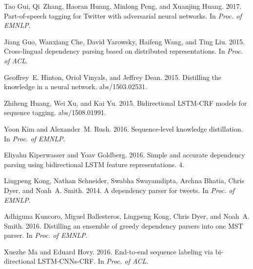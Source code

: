 \documentclass[11pt,a4paper]{article}
\begin{document}
\begin{thebibliography}{}
	Tao Gui, Qi~Zhang, Haoran Huang, Minlong Peng, and Xuanjing Huang. 2017.
	\newblock Part-of-speech tagging for {Twitter} with adversarial neural
	networks.
	\newblock In {\em Proc. of EMNLP\/}.
	
	Jiang Guo, Wanxiang Che, David Yarowsky, Haifeng Wang, and Ting Liu. 2015.
	\newblock Cross-lingual dependency parsing based on distributed
	representations.
	\newblock In {\em Proc. of ACL\/}.
	
	Geoffrey~E. Hinton, Oriol Vinyals, and Jeffrey Dean. 2015.
	\newblock Distilling the knowledge in a neural network.
	 abs/1503.02531.
	
	Zhiheng Huang, Wei Xu, and Kai Yu. 2015.
	\newblock Bidirectional {LSTM-CRF} models for sequence tagging.
	 abs/1508.01991.
	
	Yoon Kim and Alexander~M. Rush. 2016.
	\newblock Sequence-level knowledge distillation.
	\newblock In {\em Proc. of EMNLP\/}.
	
	Eliyahu Kiperwasser and Yoav Goldberg. 2016.
	\newblock Simple and accurate dependency parsing using bidirectional {LSTM}
	feature representations.
	 4.
	
	Lingpeng Kong, Nathan Schneider, Swabha Swayamdipta, Archna Bhatia, Chris Dyer,
	and Noah~A. Smith. 2014.
	\newblock A dependency parser for tweets.
	\newblock In {\em Proc. of EMNLP\/}.
	
	Adhiguna Kuncoro, Miguel Ballesteros, Lingpeng Kong, Chris Dyer, and Noah~A.
	Smith. 2016.
	\newblock Distilling an ensemble of greedy dependency parsers into one {MST}
	parser.
	\newblock In {\em Proc. of EMNLP\/}.
	
	Xuezhe Ma and Eduard Hovy. 2016.
	\newblock End-to-end sequence labeling via bi-directional {LSTM-CNNs-CRF}.
	\newblock In {\em Proc. of ACL\/}.
	

\end{thebibliography}
\end{document}
